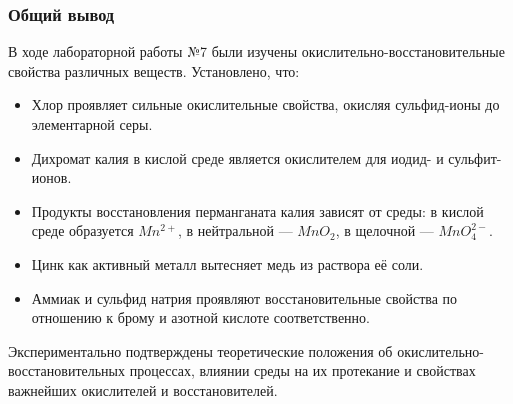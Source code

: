 \documentclass[a4paper,12pt]{article}
\begin{document}
	\subsubsection*{Общий вывод}
	
	\quad В ходе лабораторной работы №7 были изучены окислительно-восстановительные свойства различных веществ. Установлено, что:
	
	\begin{itemize}
		\item Хлор проявляет сильные окислительные свойства, окисляя сульфид-ионы до элементарной серы.
		\item Дихромат калия в кислой среде является окислителем для иодид- и сульфит-ионов.
		\item Продукты восстановления перманганата калия зависят от среды: в кислой среде образуется \(Mn^{2+}\), в нейтральной — \(MnO_2\), в щелочной — \(MnO_4^{2-}\).
		\item Цинк как активный металл вытесняет медь из раствора её соли.
		\item Аммиак и сульфид натрия проявляют восстановительные свойства по отношению к брому и азотной кислоте соответственно.
	\end{itemize}
	
	\quad Экспериментально подтверждены теоретические положения об окислительно-восстановительных процессах, влиянии среды на их протекание и свойствах важнейших окислителей и восстановителей.
	
\end{document}
